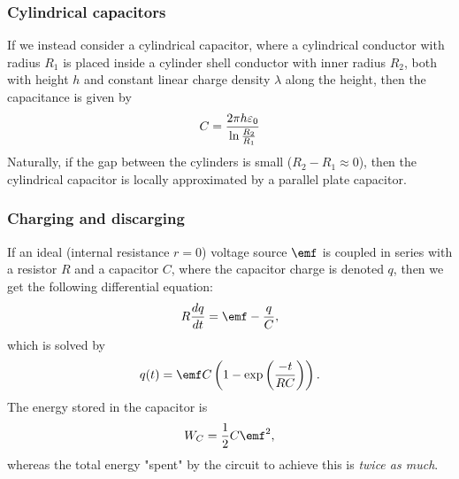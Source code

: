     \subsubsection{Cylindrical capacitors}
        If we instead consider a cylindrical capacitor, 
        where a cylindrical conductor with radius $R_1$ is placed inside a cylinder shell conductor with inner radius $R_2$, 
        both with height $h$ and constant linear charge density $\lambda$ along the height, then the capacitance is given by 
        \begin{equation}
            C = \frac{2\pi h \varepsilon_0}{\ln{\frac{R_2}{R_1}}}
        \end{equation}
        Naturally, if the gap between the cylinders is small ($R_2 - R_1 \approx 0$), 
        then the cylindrical capacitor is locally approximated by a parallel plate capacitor.

    \subsubsection{Charging and discarging}
        If an ideal (internal resistance $r=0$) voltage source $\emf$ is coupled in series with a resistor $R$ 
        and a capacitor $C$, where the capacitor charge is denoted $q$, then we get the following differential equation: 
        \begin{equation}
            R\frac{dq}{dt} = \emf - \frac{q}{C},
        \end{equation}
        which is solved by
        \begin{equation}
            q(t) = \emf C \left(1-\exp\left(\frac{-t}{RC}\right)\right).
        \end{equation}
        The energy stored in the capacitor is 
        \begin{equation}
            W_C = \frac{1}{2}C\emf^2,
        \end{equation}
        whereas the total energy "spent" by the circuit to achieve this is \textit{twice as much}.
